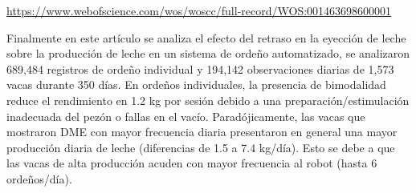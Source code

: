 \url{https://www.webofscience.com/wos/woscc/full-record/WOS:001463698600001}

Finalmente en este artículo se analiza el efecto del retraso en la eyección de leche sobre la producción de leche en un sistema de ordeño automatizado, se analizaron 689,484 registros de ordeño individual y 194,142 observaciones diarias de 1,573 vacas durante 350 días. En ordeños individuales, la presencia de bimodalidad reduce el rendimiento en 1.2 kg por sesión debido a una preparación/estimulación inadecuada del pezón o fallas en el vacío. Paradójicamente, las vacas que mostraron DME con mayor frecuencia diaria presentaron en general una mayor producción diaria de leche (diferencias de 1.5 a 7.4 kg/día). Esto se debe a que las vacas de alta producción acuden con mayor frecuencia al robot (hasta 6 ordeños/día).
